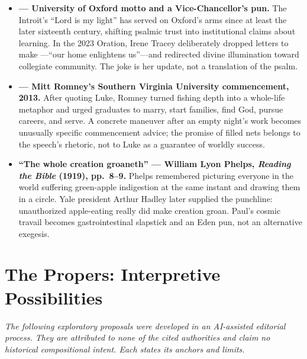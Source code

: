 {\small
\begin{itemize}[itemsep=0.35em,topsep=0.2em,parsep=0pt]
\item \textbf{ --- University of Oxford motto and a Vice-Chancellor's pun.} The Introit's ``Lord is my light'' has served on Oxford's arms since at least the later sixteenth century, shifting psalmic trust into institutional claims about learning. In the 2023 Oration, Irene Tracey deliberately dropped letters to make ---``our home enlightens us''---and redirected divine illumination toward collegiate community. The joke is her update, not a translation of the psalm.

\item \textbf{ --- Mitt Romney's Southern Virginia University commencement, 2013.} After quoting Luke, Romney turned fishing depth into a whole-life metaphor and urged graduates to marry, start families, find God, pursue careers, and serve. A concrete maneuver after an empty night's work becomes unusually specific commencement advice; the promise of filled nets belongs to the speech's rhetoric, not to Luke as a guarantee of worldly success.

\item \textbf{``The whole creation groaneth'' --- William Lyon Phelps, \emph{Reading the Bible} (1919), pp.~8--9.} Phelps remembered picturing everyone in the world suffering green-apple indigestion at the same instant and drawing them in a circle. Yale president Arthur Hadley later supplied the punchline: unauthorized apple-eating really did make creation groan. Paul's cosmic travail becomes gastrointestinal slapstick and an Eden pun, not an alternative exegesis.
\end{itemize}
}

\sectionguard
\section*{The Propers: Interpretive Possibilities}

\noindent\emph{The following exploratory proposals were developed in an AI-assisted editorial process. They are attributed to none of the cited authorities and claim no historical compositional intent. Each states its anchors and limits.}

